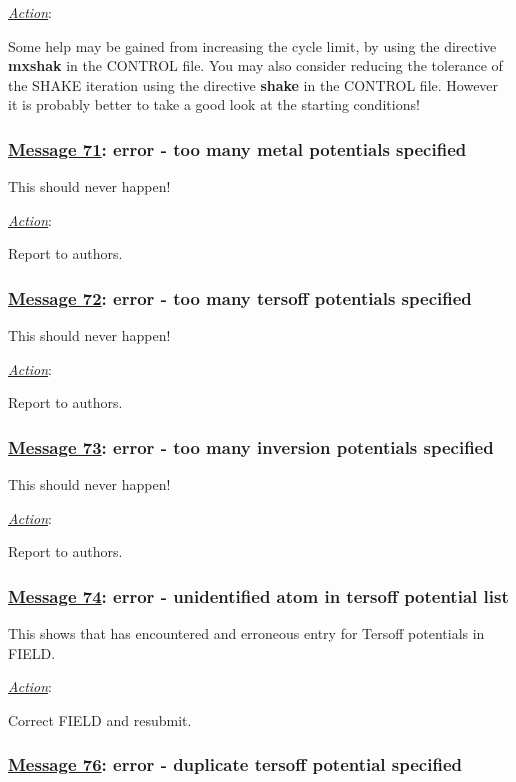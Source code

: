 \noindent \underline{\em Action}:

Some help may be gained from increasing the cycle limit, by using
the directive {\bf mxshak} in the CONTROL file. You may also
consider reducing the tolerance of the SHAKE iteration using the
directive {\bf shake} in the CONTROL file. However it is probably
better to take a good look at the starting conditions!

\subsubsection*{\underline{Message 71}: error - too many metal potentials specified}

This should never happen!

\noindent \underline{\em Action}:

Report to authors.

\subsubsection*{\underline{Message 72}: error - too many tersoff potentials specified}

This should never happen!

\noindent \underline{\em Action}:

Report to authors.

\subsubsection*{\underline{Message 73}: error - too many inversion potentials specified}

This should never happen!

\noindent \underline{\em Action}:

Report to authors.

\subsubsection*{\underline{Message 74}: error - unidentified atom in tersoff potential list}

This shows that \D has encountered and erroneous entry for Tersoff
potentials in FIELD.

\noindent \underline{\em Action}:

Correct FIELD and resubmit.

\subsubsection*{\underline{Message 76}: error - duplicate tersoff potential specified}

